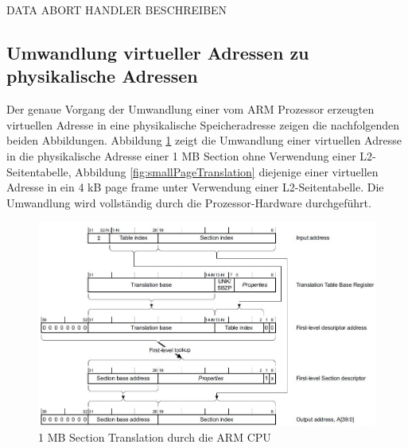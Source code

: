 \vspace{2cm}
DATA ABORT HANDLER BESCHREIBEN
\vspace{2cm}

\subsection{Umwandlung virtueller Adressen zu physikalische Adressen}

Der genaue Vorgang der Umwandlung einer vom ARM Prozessor erzeugten virtuellen Adresse in eine physikalische Speicheradresse zeigen die nachfolgenden beiden Abbildungen. Abbildung  \ref{fig:sectionTranslation} zeigt die Umwandlung einer virtuellen Adresse in die physikalische Adresse einer 1 MB Section ohne Verwendung einer L2-Seitentabelle, Abbildung \ref{fig:smallPageTranslation} diejenige einer virtuellen Adresse in ein 4 kB page frame unter Verwendung einer L2-Seitentabelle.   Die Umwandlung wird vollständig durch die Prozessor-Hardware durchgeführt.\\


\begin{figure}[H]
	\includegraphics[scale=0.8]{figures/sectionTranslation}
	\caption{1 MB Section Translation durch die ARM CPU \cite[S. B3-1335]{ARM:ARM}}
	\label{fig:sectionTranslation}
\end{figure}

